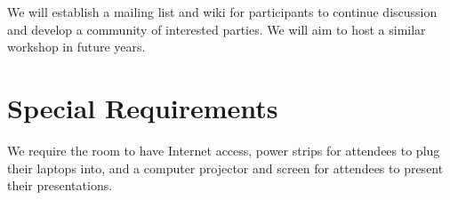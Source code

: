 \documentclass{acm_proc_article-sp}
\begin{document}
We will establish a mailing list and wiki for participants 
to continue discussion and develop a community of 
interested parties. 
We will aim to host a similar workshop in future years.

\section{Special Requirements}

We require the room to have Internet access, power strips for 
attendees to plug their laptops into, and a computer projector 
and screen for attendees to present their presentations.

% 
%  
\end{document}
